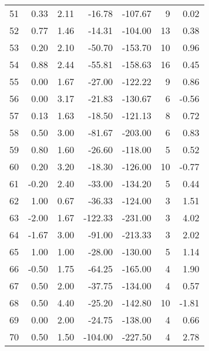 \begin{appendices}
\begin{longtable}[c]{@{}rrrrrrr@{}}
51 & 0.33 & 2.11 & -16.78 & -107.67 & 9 & 0.02 \\

52 & 0.77 & 1.46 & -14.31 & -104.00 & 13 & 0.38 \\

53 & 0.20 & 2.10 & -50.70 & -153.70 & 10 & 0.96 \\

54 & 0.88 & 2.44 & -55.81 & -158.63 & 16 & 0.45 \\

55 & 0.00 & 1.67 & -27.00 & -122.22 & 9 & 0.86 \\

56 & 0.00 & 3.17 & -21.83 & -130.67 & 6 & -0.56 \\

57 & 0.13 & 1.63 & -18.50 & -121.13 & 8 & 0.72 \\

58 & 0.50 & 3.00 & -81.67 & -203.00 & 6 & 0.83 \\

59 & 0.80 & 1.60 & -26.60 & -118.00 & 5 & 0.52 \\

60 & 0.20 & 3.20 & -18.30 & -126.00 & 10 & -0.77 \\

61 & -0.20 & 2.40 & -33.00 & -134.20 & 5 & 0.44 \\

62 & 1.00 & 0.67 & -36.33 & -124.00 & 3 & 1.51 \\

63 & -2.00 & 1.67 & -122.33 & -231.00 & 3 & 4.02 \\

64 & -1.67 & 3.00 & -91.00 & -213.33 & 3 & 2.02 \\

65 & 1.00 & 1.00 & -28.00 & -130.00 & 5 & 1.14 \\

66 & -0.50 & 1.75 & -64.25 & -165.00 & 4 & 1.90 \\

67 & 0.50 & 2.00 & -37.75 & -134.00 & 4 & 0.57 \\

68 & 0.50 & 4.40 & -25.20 & -142.80 & 10 & -1.81 \\

69 & 0.00 & 2.00 & -24.75 & -138.00 & 4 & 0.66 \\

70 & 0.50 & 1.50 & -104.00 & -227.50 & 4 & 2.78 \\


\end{longtable}
\end{appendices}
